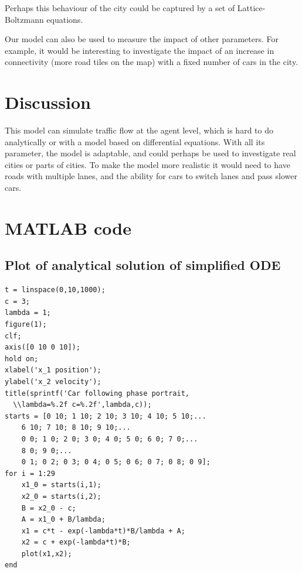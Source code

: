 \documentclass[11pt,a4paper]{article}
\begin{document}
Perhaps this behaviour of the city could be captured by a set of
Lattice-Boltzmann equations.

Our model can also be used to measure the impact of other parameters. For
example, it would be interesting to investigate the impact of an increase in
connectivity (more road tiles on the map) with a fixed number of cars in the
city.

\section{Discussion}
This model can simulate traffic flow at the agent level, which is hard to do
analytically or with a model based on differential equations. With all its
parameter, the model is adaptable, and could perhaps be used to investigate real
cities or parts of cities. To make the model more realistic it would need to
have roads with multiple lanes, and the ability for cars to switch lanes and
pass slower cars.

\section{MATLAB code}
\subsection{Plot of analytical solution of simplified ODE}
\begin{verbatim}
t = linspace(0,10,1000);
c = 3;
lambda = 1;
figure(1);
clf;
axis([0 10 0 10]);
hold on;
xlabel('x_1 position');
ylabel('x_2 velocity');
title(sprintf('Car following phase portrait,
  \\lambda=%.2f c=%.2f',lambda,c));
starts = [0 10; 1 10; 2 10; 3 10; 4 10; 5 10;...
    6 10; 7 10; 8 10; 9 10;...
    0 0; 1 0; 2 0; 3 0; 4 0; 5 0; 6 0; 7 0;...
    8 0; 9 0;...
    0 1; 0 2; 0 3; 0 4; 0 5; 0 6; 0 7; 0 8; 0 9];
for i = 1:29
    x1_0 = starts(i,1);
    x2_0 = starts(i,2);
    B = x2_0 - c;
    A = x1_0 + B/lambda;
    x1 = c*t - exp(-lambda*t)*B/lambda + A;
    x2 = c + exp(-lambda*t)*B;
    plot(x1,x2);
end

\end{verbatim}
\end{document}
